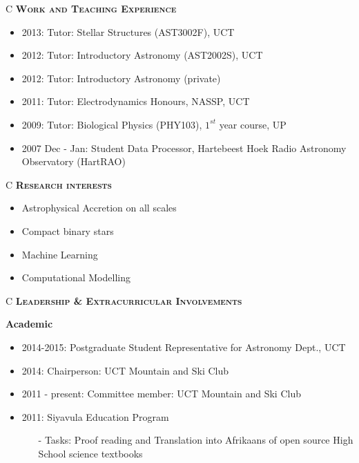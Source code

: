 \documentclass{article}
\renewcommand{\section}[1]{
  \vspace{0.4cm}
  \begin{table}[!htp]					%
    \newcolumntype{C}{>{\centering\arraybackslash}X}	%
    \setlength\extrarowheight{3pt} 			%

    \noindent 						%
    \begin{tabularx}{\textwidth}{C}
    \hline \hline 
      \large \textbf{ \textsc{#1} } \\ 
    \hline \hline
    \end{tabularx}
  \end{table}
}
\begin{document}



 
 

\section{Work and Teaching Experience}
\begin{itemize}
 \item 2013: Tutor: Stellar Structures (AST3002F), UCT
 \item 2012: Tutor: Introductory Astronomy (AST2002S), UCT
 \item 2012: Tutor: Introductory Astronomy (private)
 \item 2011: Tutor: Electrodynamics Honours, NASSP, UCT
 \item 2009: Tutor: Biological Physics (PHY103), $1^{st}$ year course, UP
 \item 2007 Dec - Jan: Student Data Processor, Hartebeest Hoek Radio Astronomy Observatory (HartRAO)\\
\end{itemize}



\section{Research interests}
\begin{itemize}
 \item Astrophysical Accretion on all scales
 \item Compact binary stars
 \item Machine Learning
 \item Computational Modelling
\end{itemize}



\section{Leadership \& Extracurricular Involvements}
\large\textbf{Academic}
\vspace{0.2cm}
\normalsize
\begin{itemize}
 \item 2014-2015: Postgraduate Student Representative for Astronomy Dept., UCT
 \item 2014: Chairperson: UCT Mountain and Ski Club
 \item 2011 - present: Committee member: UCT Mountain and Ski Club
 \item 2011: Siyavula Education Program
 \begin{itemize}
  \item[-] Tasks: Proof reading and Translation into Afrikaans of open source High School science textbooks
  \end{itemize}
\end{itemize} 
\vspace{0.2cm}
\end{document}
